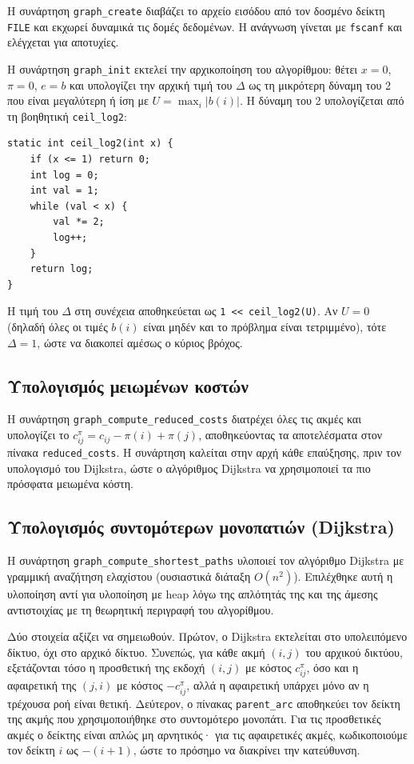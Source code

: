 \documentclass[11pt,a4paper,oneside]{report}
\let\oldsubsection\subsection
\renewcommand{\subsection}{\FloatBarrier\oldsubsection}
\begin{document}
Η συνάρτηση \texttt{graph\_create} διαβάζει το αρχείο εισόδου από τον δοσμένο δείκτη \texttt{FILE} και εκχωρεί δυναμικά τις δομές δεδομένων. Η ανάγνωση γίνεται με \texttt{fscanf} και ελέγχεται για αποτυχίες.

Η συνάρτηση \texttt{graph\_init} εκτελεί την αρχικοποίηση του αλγορίθμου: θέτει $x = 0$, $\pi = 0$, $e = b$ και υπολογίζει την αρχική τιμή του $\Delta$ ως τη μικρότερη δύναμη του 2 που είναι μεγαλύτερη ή ίση με $U = \max_i |b(i)|$. Η δύναμη του 2 υπολογίζεται από τη βοηθητική \texttt{ceil\_log2}:

\begin{verbatim}
static int ceil_log2(int x) {
    if (x <= 1) return 0;
    int log = 0;
    int val = 1;
    while (val < x) {
        val *= 2;
        log++;
    }
    return log;
}
\end{verbatim}

Η τιμή του $\Delta$ στη συνέχεια αποθηκεύεται ως \texttt{1 << ceil\_log2(U)}. Αν $U = 0$ (δηλαδή όλες οι τιμές $b(i)$ είναι μηδέν και το πρόβλημα είναι τετριμμένο), τότε $\Delta = 1$, ώστε να διακοπεί αμέσως ο κύριος βρόχος.

\subsection{Υπολογισμός μειωμένων κοστών}

Η συνάρτηση \texttt{graph\_compute\_reduced\_costs} διατρέχει όλες τις ακμές και υπολογίζει το $c^{\pi}_{ij} = c_{ij} - \pi(i) + \pi(j)$, αποθηκεύοντας τα αποτελέσματα στον πίνακα \texttt{reduced\_costs}. Η συνάρτηση καλείται στην αρχή κάθε επαύξησης, πριν τον υπολογισμό του \textenglish{Dijkstra}, ώστε ο αλγόριθμος \textenglish{Dijkstra} να χρησιμοποιεί τα πιο πρόσφατα μειωμένα κόστη.

\subsection{Υπολογισμός συντομότερων μονοπατιών (\textenglish{Dijkstra})}

Η συνάρτηση \texttt{graph\_compute\_shortest\_paths} υλοποιεί τον αλγόριθμο \textenglish{Dijkstra} με γραμμική αναζήτηση ελαχίστου (ουσιαστικά διάταξη $O(n^2)$). Επιλέχθηκε αυτή η υλοποίηση αντί για υλοποίηση με \textenglish{heap} λόγω της απλότητάς της και της άμεσης αντιστοιχίας με τη θεωρητική περιγραφή του αλγορίθμου.

Δύο στοιχεία αξίζει να σημειωθούν. Πρώτον, ο \textenglish{Dijkstra} εκτελείται στο υπολειπόμενο δίκτυο, όχι στο αρχικό δίκτυο. Συνεπώς, για κάθε ακμή $(i,j)$ του αρχικού δικτύου, εξετάζονται τόσο η προσθετική της εκδοχή $(i,j)$ με κόστος $c^{\pi}_{ij}$, όσο και η αφαιρετική της $(j,i)$ με κόστος $-c^{\pi}_{ij}$, αλλά η αφαιρετική υπάρχει μόνο αν η τρέχουσα ροή είναι θετική. Δεύτερον, ο πίνακας \texttt{parent\_arc} αποθηκεύει τον δείκτη της ακμής που χρησιμοποιήθηκε στο συντομότερο μονοπάτι. Για τις προσθετικές ακμές ο δείκτης είναι απλώς μη αρνητικός· για τις αφαιρετικές ακμές, κωδικοποιούμε τον δείκτη $i$ ως $-(i+1)$, ώστε το πρόσημο να διακρίνει την κατεύθυνση.
\end{document}
